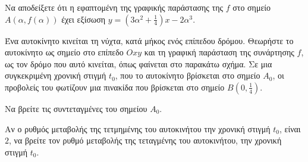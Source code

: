 \begin{alist}
\item Να αποδείξετε ότι η εφαπτομένη της γραφικής παράστασης της $f$ στο σημείο $A(\alpha, f(\alpha))$ έχει εξίσωση $y = \left(3\alpha^2 + \frac{1}{4}\right)x - 2\alpha^3$. 
\item Ένα αυτοκίνητο κινείται τη νύχτα, κατά μήκος ενός επίπεδου δρόμου. Θεωρήστε το αυτοκίνητο ως σημείο στο επίπεδο $Oxy$ και τη γραφική παράσταση της συνάρτησης $f$, ως τον δρόμο που αυτό κινείται, όπως φαίνεται στο παρακάτω σχήμα. Σε μια συγκεκριμένη χρονική στιγμή $t_0$, που το αυτοκίνητο βρίσκεται στο σημείο $A_0$, οι προβολείς του φωτίζουν μια πινακίδα που βρίσκεται στο σημείο $B\left(0, \frac{1}{4}\right)$.
\begin{rlist}
\item Να βρείτε τις συντεταγμένες του σημείου $A_0$. 
\item Αν ο ρυθμός μεταβολής της τετμημένης του αυτοκινήτου την χρονική στιγμή $t_0$, είναι $2$, να βρείτε τον ρυθμό μεταβολής της τεταγμένης του αυτοκινήτου, την χρονική στιγμή $t_0$. 
\end{rlist}
\end{alist}